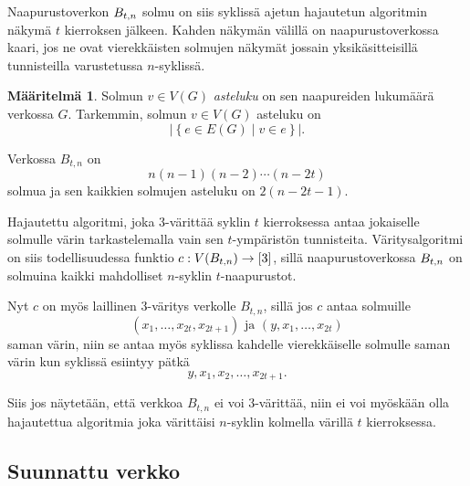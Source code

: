 \documentclass[finnish]{tktltiki2}
\theoremstyle{definition}
\newtheorem{maar}[lau]{Määritelmä}
\theoremstyle{remark}
\newcommand{\set}[1]{\left\{ #1 \right\}}
\begin{document}
Naapurustoverkon $B_{t,n}$ solmu on siis syklissä ajetun hajautetun algoritmin
näkymä $t$ kierroksen jälkeen. Kahden näkymän välillä on naapurustoverkossa
kaari, jos ne ovat vierekkäisten solmujen näkymät jossain yksikäsitteisillä
tunnisteilla varustetussa $n$-syklissä.

\begin{maar}
    Solmun $v \in V(G)$ \emph{asteluku} on sen naapureiden lukumäärä verkossa
    $G$. Tarkemmin, solmun $v \in V(G)$ asteluku on
    \begin{equation*}
            |\set{e \in E(G) \mid v \in e}|.
    \end{equation*}
\end{maar}

Verkossa $B_{t,n}$ on
%
\begin{equation*}
    n(n-1)(n-2) \cdots (n-2t)
\end{equation*}
%
solmua ja sen kaikkien solmujen asteluku on $2(n-2t-1)$.



Hajautettu algoritmi, joka 3-värittää syklin $t$ kierroksessa antaa jokaiselle
solmulle värin tarkastelemalla vain sen $t$-ympäristön tunnisteita.
Vä\-ri\-tys\-al\-go\-rit\-mi on siis todellisuudessa funktio $c : V(B_{t,n}) \to [3]$, sillä
naapurustoverkossa $B_{t,n}$ on solmuina kaikki mahdolliset $n$-syklin
$t$-naapurustot.

Nyt $c$ on myös laillinen 3-väritys verkolle $B_{t,n}$, sillä jos $c$ antaa
solmuille
%
\begin{equation*}
    (x_1, \dots, x_{2t}, x_{2t+1}) \text{ ja } (y,x_1,\dots,x_{2t})
\end{equation*}
%
saman värin, niin se antaa myös syklissa kahdelle vierekkäiselle solmulle saman
värin kun syklissä esiintyy pätkä
%
\begin{equation*}
    y, x_1, x_2, \dots, x_{2t+1}.
\end{equation*}

Siis jos näytetään, että verkkoa $B_{t,n}$ ei voi 3-värittää, niin ei voi
myös\-kään olla hajautettua algoritmia joka värittäisi $n$-syklin kolmella
värillä $t$ kierroksessa.

\subsection{Suunnattu verkko}
\end{document}
